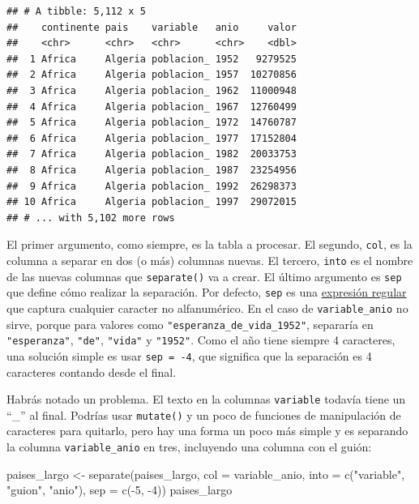 \documentclass[
  openany]{book}
\newenvironment{Shaded}{\begin{snugshade}}{\end{snugshade}}
\newcommand{\AttributeTok}[1]{\textcolor[rgb]{0.77,0.63,0.00}{#1}}
\newcommand{\DecValTok}[1]{\textcolor[rgb]{0.00,0.00,0.81}{#1}}
\newcommand{\FunctionTok}[1]{\textcolor[rgb]{0.00,0.00,0.00}{#1}}
\newcommand{\NormalTok}[1]{#1}
\newcommand{\OtherTok}[1]{\textcolor[rgb]{0.56,0.35,0.01}{#1}}
\newcommand{\SpecialCharTok}[1]{\textcolor[rgb]{0.00,0.00,0.00}{#1}}
\newcommand{\StringTok}[1]{\textcolor[rgb]{0.31,0.60,0.02}{#1}}
\begin{document}
\begin{verbatim}
## # A tibble: 5,112 x 5
##    continente pais    variable   anio     valor
##    <chr>      <chr>   <chr>      <chr>    <dbl>
##  1 Africa     Algeria poblacion_ 1952   9279525
##  2 Africa     Algeria poblacion_ 1957  10270856
##  3 Africa     Algeria poblacion_ 1962  11000948
##  4 Africa     Algeria poblacion_ 1967  12760499
##  5 Africa     Algeria poblacion_ 1972  14760787
##  6 Africa     Algeria poblacion_ 1977  17152804
##  7 Africa     Algeria poblacion_ 1982  20033753
##  8 Africa     Algeria poblacion_ 1987  23254956
##  9 Africa     Algeria poblacion_ 1992  26298373
## 10 Africa     Algeria poblacion_ 1997  29072015
## # ... with 5,102 more rows
\end{verbatim}

El primer argumento, como siempre, es la tabla a procesar.
El segundo, \texttt{col}, es la columna a separar en dos (o más) columnas nuevas.
El tercero, \texttt{into} es el nombre de las nuevas columnas que \texttt{separate()} va a crear.
El último argumento es \texttt{sep} que define cómo realizar la separación.
Por defecto, \texttt{sep} es una \href{https://es.wikipedia.org/wiki/Expresi\%C3\%B3n_regular}{expresión regular} que captura cualquier caracter no alfanumérico.
En el caso de \texttt{variable\_anio} no sirve, porque para valores como \texttt{"esperanza\_de\_vida\_1952"}, separaría en \texttt{"esperanza"}, \texttt{"de"}, \texttt{"vida"} y \texttt{"1952"}.
Como el año tiene siempre 4 caracteres, una solución simple es usar \texttt{sep\ =\ -4}, que significa que la separación es 4 caracteres contando desde el final.

Habrás notado un problema.
El texto en la columnas \texttt{variable} todavía tiene un ``\_'' al final.
Podrías usar \texttt{mutate()} y un poco de funciones de manipulación de caracteres para quitarlo, pero hay una forma un poco más simple y es separando la columna \texttt{variable\_anio} en tres, incluyendo una columna con el guión:

\begin{Shaded}
\begin{Highlighting}[]
\NormalTok{paises\_largo }\OtherTok{\textless{}{-}} \FunctionTok{separate}\NormalTok{(paises\_largo, }
         \AttributeTok{col =}\NormalTok{ variable\_anio, }
         \AttributeTok{into =} \FunctionTok{c}\NormalTok{(}\StringTok{"variable"}\NormalTok{, }\StringTok{"guion"}\NormalTok{, }\StringTok{"anio"}\NormalTok{), }
         \AttributeTok{sep =} \FunctionTok{c}\NormalTok{(}\SpecialCharTok{{-}}\DecValTok{5}\NormalTok{, }\SpecialCharTok{{-}}\DecValTok{4}\NormalTok{))}
\NormalTok{paises\_largo}
\end{Highlighting}
\end{Shaded}
\end{document}

